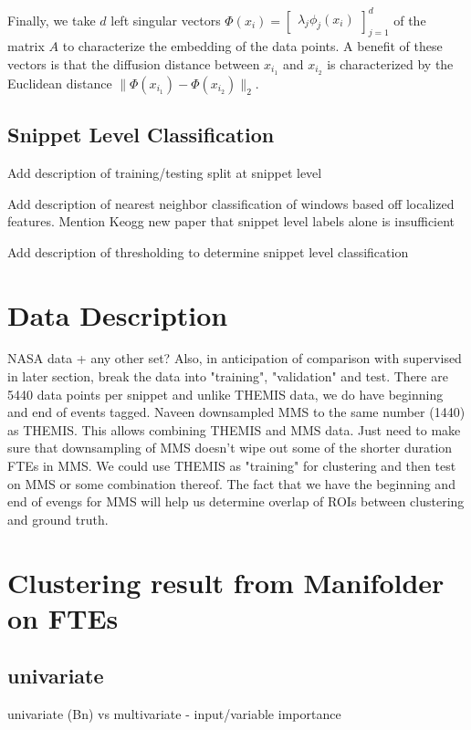 \documentclass[aps,preprint,superscriptaddress]{revtex4}
\newcommand{\ac}[1]{{\color{red} #1}}
\begin{document}
Finally, we take $d$ left singular vectors $\Phi(x_i) = \begin{bmatrix}\lambda_j\phi_{j}(x_i)\end{bmatrix}_{j=1}^d$ of the matrix $A$ to characterize the embedding of the data points.  A benefit of these vectors is that the diffusion distance between $x_{i_1}$ and $x_{i_2}$ is characterized by the Euclidean distance $\|\Phi(x_{i_1}) - \Phi(x_{i_2})\|_2$.  


\subsection{Snippet Level Classification}
\ac{Add description of training/testing split at snippet level}

\ac{Add description of nearest neighbor classification of windows based off localized features.  Mention Keogg new paper that snippet level labels alone is insufficient}

\ac{Add description of thresholding to determine snippet level classification}


\section{Data Description}
NASA data + any other set?  Also, in anticipation of comparison with supervised in later section, break the data into "training", "validation" and test.
There are 5440 data points per snippet and unlike THEMIS data, we do have beginning and end of events tagged. Naveen downsampled MMS to the same number (1440) as THEMIS. This allows combining THEMIS and MMS data. Just need to make sure that downsampling of MMS doesn’t wipe out some of the shorter duration FTEs in MMS. We could use THEMIS as "training" for clustering and then test on MMS or some combination thereof. The fact that we have the beginning and end of evengs for MMS will help us determine overlap of ROIs between clustering and ground truth.



\label{sec:data}

\section{Clustering result from Manifolder on FTEs}
\label{sec:manifolderFTE}
\subsection{univariate}
univariate (Bn) vs multivariate - input/variable importance
\end{document}
